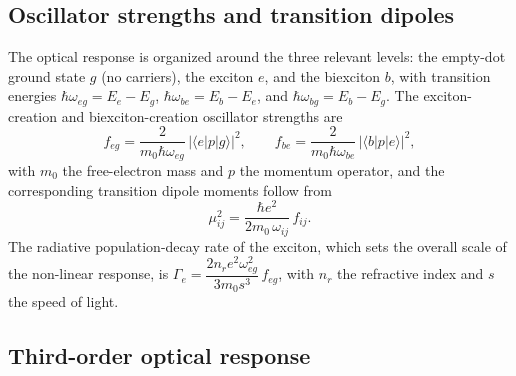 \subsection{Oscillator strengths and transition dipoles}

The optical response is organized around the three relevant levels: the empty-dot
ground state $g$ (no carriers), the exciton $e$, and the biexciton $b$, with
transition energies $\hbar\omega_{eg}=E_e-E_g$, $\hbar\omega_{be}=E_b-E_e$, and
$\hbar\omega_{bg}=E_b-E_g$. The exciton-creation and biexciton-creation
oscillator strengths are
\begin{equation}
  f_{eg}=\frac{2}{m_0\hbar\omega_{eg}}\,\big|\langle e|p|g\rangle\big|^{2},
  \qquad
  f_{be}=\frac{2}{m_0\hbar\omega_{be}}\,\big|\langle b|p|e\rangle\big|^{2},
  \label{eq:osc}
\end{equation}
with $m_0$ the free-electron mass and $p$ the momentum operator, and the
corresponding transition dipole moments follow from
\begin{equation}
  \mu_{ij}^{2}=\frac{\hbar e^{2}}{2m_0\,\omega_{ij}}\,f_{ij}.
  \label{eq:dipole}
\end{equation}
The radiative population-decay rate of the exciton, which sets the overall scale
of the non-linear response, is
$\Gamma_e=\dfrac{2n_r e^{2}\omega_{eg}^{2}}{3m_0 s^{3}}\,f_{eg}$, with $n_r$ the
refractive index and $s$ the speed of light.

\subsection{Third-order optical response}

